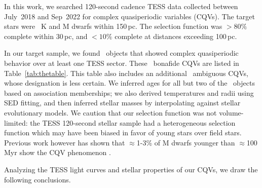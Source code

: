 \documentclass[11pt,twocolumn,tighten]{aastex63}
\begin{document}
In this work, we searched 120-second cadence TESS data collected
between July~2018 and Sep~2022 for complex quasiperiodic variables
(CQVs).  The target stars were \nstarssearched\ K and M dwarfs within
150\,pc.  The selection function was $>$$80\%$ complete within 30\,pc,
and $<$$10\%$ complete at distances exceeding 100\,pc.

In our target sample, we found \ngoods\ objects that showed complex
quasiperiodic behavior over at least one TESS sector.  These \ngoods\
bonafide CQVs are listed in Table~\ref{tab:thetable}.  This table also
includes an additional \nmaybes\ ambiguous CQVs, whose designation is
less certain.  We inferred ages for all but two of the \ncpvsfound\
objects based on association memberships; we also derived temperatures
and radii using SED fitting, and then inferred stellar masses by
interpolating against stellar evolutionary models.  We caution that
our selection function was not volume-limited: the TESS 120-second
stellar sample had a heterogeneous selection function which may have
been biased in favor of young stars over field stars.  Previous work
however has shown that $\approx$1-3\% of M dwarfs younger than
$\approx$100\,Myr show the CQV phenomenon
\citep{2016AJ....152..114R,2022AJ....163..144G}.

Analyzing the TESS light curves and stellar properties of our CQVs, we
draw the following conclusions.
\end{document}
